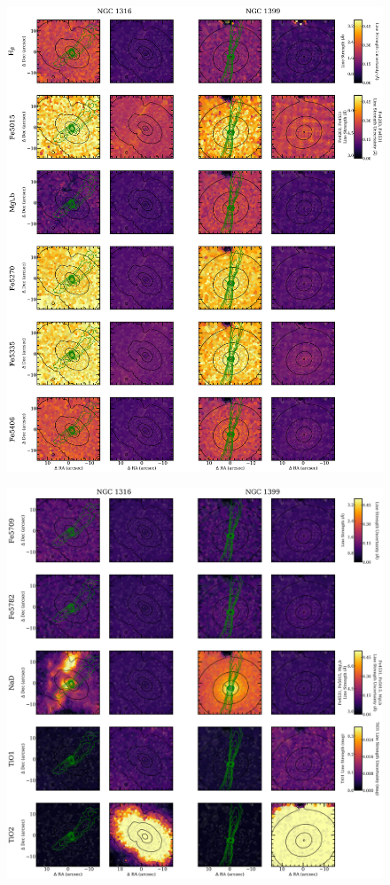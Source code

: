 		\begin{figure}
			\centering
			\includegraphics[height=0.94\textheight]{chapter4/muse/abs2.png}
		\end{figure}
		\begin{figure}
			\centering
			\includegraphics[height=0.54\textheight]{chapter4/muse/abs2b.png}
		\end{figure}


